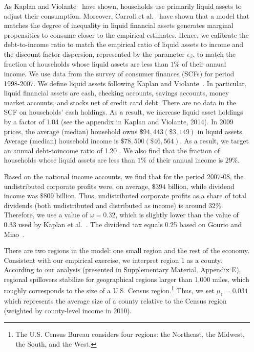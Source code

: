 \documentclass[\latexroot/\projectname]{subfiles}
\begin{document}
As Kaplan and Violante~\cite{Kaplan2014-ee} have shown, households use primarily liquid assets to adjust their consumption. Moreover, Carroll et al.~\cite{Carroll2017-cp} have shown that a model that matches the degree of inequality in liquid financial assets generates marginal propensities to consume closer to the empirical estimates. Hence, we calibrate the debt-to-income ratio to match the empirical ratio of liquid assets to income and the discount factor dispersion, represented by the parameter $\epsilon_{\beta}$, to match the fraction of households whose liquid assets are less than $1 \%$ of their annual income. We use data from the survey of consumer finances (SCFs) for period 1998-2007. We define liquid assets following Kaplan and Violante~\cite{Kaplan2014-ee}. In particular, liquid financial assets are cash, checking accounts, savings accounts, money market accounts, and stocks net of credit card debt. There are no data in the SCF on households' cash holdings. As a result, we increase liquid asset holdings by a factor of 1.04 (see the appendix in Kaplan and Violante, 2014). In 2009 prices, the average (median) household owns $\$ 94,443(\$ 3,149)$ in liquid assets. Average (median) household income is $\$ 78,500(\$ 46,564)$. As a result, we target an annual debt-toincome ratio of 1.20 . We also find that the fraction of households whose liquid assets are less than $1 \%$ of their annual income is $29 \%$.

Based on the national income accounts, we find that for the period 2007-08, the undistributed corporate profits were, on average, $\$ 394$ billion, while dividend income was $\$ 809$ billion. Thus, undistributed corporate profits as a share of total dividends (both undistributed and distributed as income) is around $32 \%$. Therefore, we use a value of $\omega=0.32$, which is slightly lower than the value of 0.33 used by Kaplan et al.~\cite{Kaplan2018-sr}. The dividend tax equals 0.25 based on Gourio and Miao~\cite{Gourio2010-si}.

There are two regions in the model: one small region and the rest of the economy. Consistent with our empirical exercise, we interpret region 1 as a county. According to our analysis (presented in Supplementary Material, Appendix E), regional spillovers stabilize for geographical regions larger than 1,000 miles, which roughly corresponds to the size of a U.S. Census region.\footnote{The U.S. Census Bureau considers four regions: the Northeast, the Midwest, the South, and the West.} Thus, we set $\mu_{1}=0.031$ which represents the average size of a county relative to the Census region (weighted by county-level income in 2010).
\end{document}
